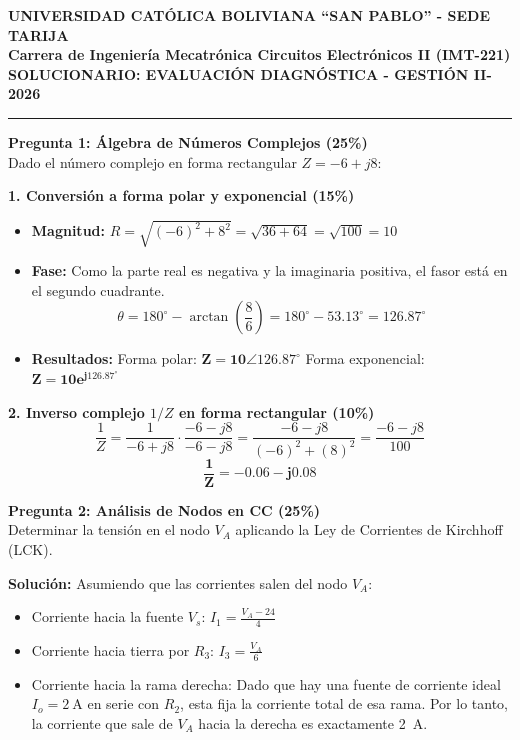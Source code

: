 \documentclass[11pt,a4paper]{article}
\begin{document}
\begin{center}
    \textbf{\Large UNIVERSIDAD CATÓLICA BOLIVIANA ``SAN PABLO'' - SEDE TARIJA}\\[0.3cm]
    \textbf{\large Carrera de Ingeniería Mecatrónica \textbar{} Circuitos Electrónicos II (IMT-221)}\\[0.5cm]
    \textbf{\Large SOLUCIONARIO: EVALUACIÓN DIAGNÓSTICA - GESTIÓN II-2026}
\end{center}

\vspace{0.5cm}
\noindent\textcolor{blue!80!black}{\rule{\textwidth}{1pt}}

\vspace{0.5cm}
\noindent \textbf{Pregunta 1: Álgebra de Números Complejos (25\%)} \\
Dado el número complejo en forma rectangular $Z = -6 + j8$:

\textbf{1. Conversión a forma polar y exponencial (15\%)}
\begin{itemize}
    \item \textbf{Magnitud:} $R = \sqrt{(-6)^2 + 8^2} = \sqrt{36 + 64} = \sqrt{100} = 10$
    \item \textbf{Fase:} Como la parte real es negativa y la imaginaria positiva, el fasor está en el segundo cuadrante.
    $$\theta = 180^\circ - \arctan\left(\frac{8}{6}\right) = 180^\circ - 53.13^\circ = 126.87^\circ$$
    \item \textbf{Resultados:}
    Forma polar: $\mathbf{Z = 10 \angle 126.87^\circ}$ \quad \textbar \quad Forma exponencial: $\mathbf{Z = 10 e^{j126.87^\circ}}$
\end{itemize}

\textbf{2. Inverso complejo $1/Z$ en forma rectangular (10\%)}
$$ \frac{1}{Z} = \frac{1}{-6 + j8} \cdot \frac{-6 - j8}{-6 - j8} = \frac{-6 - j8}{(-6)^2 + (8)^2} = \frac{-6 - j8}{100} $$
$$ \mathbf{\frac{1}{Z} = -0.06 - j0.08} $$

\vspace{0.5cm}
\noindent \textbf{Pregunta 2: Análisis de Nodos en CC (25\%)} \\
Determinar la tensión en el nodo $V_A$ aplicando la Ley de Corrientes de Kirchhoff (LCK).

\textbf{Solución:}
Asumiendo que las corrientes salen del nodo $V_A$:
\begin{itemize}
    \item Corriente hacia la fuente $V_s$: $I_1 = \frac{V_A - 24}{4}$
    \item Corriente hacia tierra por $R_3$: $I_3 = \frac{V_A}{6}$
    \item Corriente hacia la rama derecha: Dado que hay una fuente de corriente ideal $I_o = \SI{2}{\ampere}$ en serie con $R_2$, esta fija la corriente total de esa rama. Por lo tanto, la corriente que sale de $V_A$ hacia la derecha es exactamente \SI{2}{\ampere}.
\end{itemize}
\end{document}
